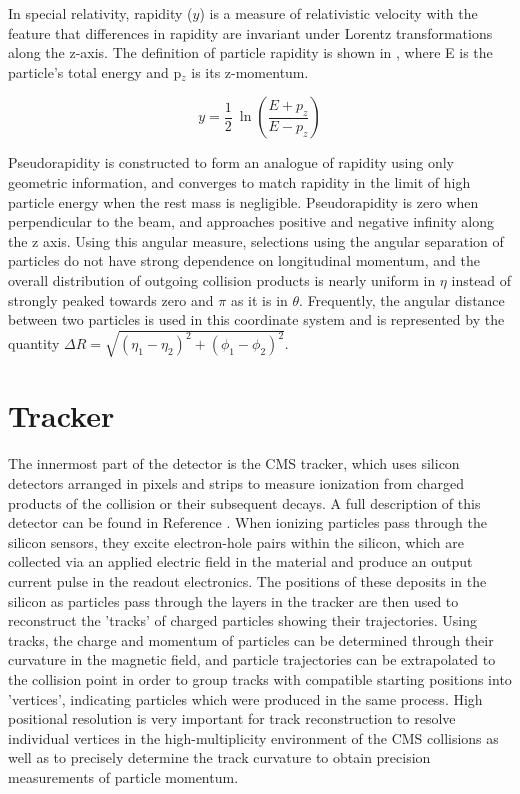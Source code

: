 In special relativity, rapidity ($y$) is a measure of relativistic velocity with the feature that differences in rapidity are invariant under Lorentz transformations along the z-axis.
The definition of particle rapidity is shown in , where E is the particle's total energy and p$_z$ is its z-momentum.

\begin{equation}
    \label{eq:rapidity}
    y = \frac{1}{2} ~\ln \left(\frac{E+p_z}{E-p_z}\right)
\end{equation}

Pseudorapidity is constructed to form an analogue of rapidity using only geometric information, and converges to match rapidity in the limit of high particle energy when the rest mass is negligible.
Pseudorapidity is zero when perpendicular to the beam, and approaches positive and negative infinity along the z axis. 
Using this angular measure, selections using the angular separation of particles do not have strong dependence on longitudinal momentum, and the overall distribution of outgoing collision products is nearly uniform in $\eta$ instead of strongly peaked towards zero and $\pi$ as it is in $\theta$.  
Frequently, the angular distance between two particles is used in this coordinate system and is represented by the quantity $\Delta R = \sqrt{(\eta_1-\eta_2)^2+(\phi_1-\phi_2)^2}$.

\section{Tracker}
The innermost part of the detector is the CMS tracker, which uses silicon detectors arranged in pixels and strips to measure ionization from charged products of the collision or their subsequent decays. 
A full description of this detector can be found in Reference \cite{trackerTDR}.
When ionizing particles pass through the silicon sensors, they excite electron-hole pairs within the silicon, which are collected via an applied electric field in the material and produce an output current pulse in the readout electronics.
The positions of these deposits in the silicon as particles pass through the layers in the tracker are then used to reconstruct the 'tracks' of charged particles showing their trajectories.
Using tracks, the charge and momentum of particles can be determined through their curvature in the magnetic field, and particle trajectories can be extrapolated to the collision point in order to group tracks with compatible starting positions into 'vertices', indicating particles which were produced in the same process. 
High positional resolution is very important for track reconstruction to resolve individual vertices in the high-multiplicity environment of the CMS collisions as well as to precisely determine the track curvature to obtain precision measurements of particle momentum. 

